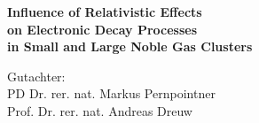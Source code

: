 \thispagestyle{empty}

\vspace*{2cm}

\begin{center}
 \Large
 \textbf{Influence of Relativistic Effects\\[1ex] on Electronic Decay Processes\\[1ex]
         in%
         Small and Large Noble Gas Clusters}


\vfill
\end{center}

\large
Gutachter:\\[2ex]
PD Dr. rer. nat. Markus Pernpointner\\
Prof. Dr. rer. nat. Andreas Dreuw

\normalsize
\cleardoublepage

